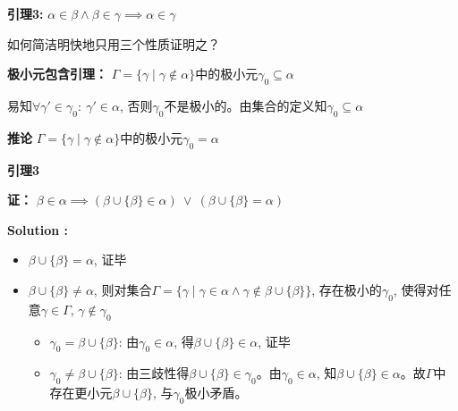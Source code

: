 \documentclass[UTF8, 9pt, a4paper]{ctexart}
\newcommand{\ksec}[2]{\noindent \textbf{\large #1} #2\par}
\newcommand{\ksolve}[1]{\noindent\textbf{\large Solution #1: }\par}
\begin{document}
	\vspace{0.5cm}
	
	\ksec{引理3: }{$ \alpha \in \beta \land \beta \in \gamma \implies \alpha \in \gamma $}
	如何简洁明快地只用三个性质证明之？
	
	\vspace{0.5cm}
	
	\ksec{极小元包含引理：}{$ \Gamma = \{ \gamma \mid \gamma \notin \alpha \} $中的极小元$ \gamma_0 \subseteq \alpha$}
	易知$ \forall \gamma' \in \gamma_0 :\ \gamma' \in \alpha$, 否则$ \gamma_0 $不是极小的。由集合的定义知$ \gamma_0 \subseteq \alpha $
	
	\ksec{推论}{ $ \Gamma = \{ \gamma \mid \gamma \notin \alpha \} $中的极小元$ \gamma_0 = \alpha$ }
	\vspace{0.5cm}
	
	\ksec{引理3}{}
	
	
	\ksec{证：}{$ \beta \in \alpha \implies (\beta \cup \{\beta\} \in \alpha)\ \lor\  (\beta\cup\{\beta\} = \alpha)$}
	\ksolve{}
	\begin{itemize}
		\item $ \beta \cup \{\beta\} = \alpha $, 证毕
		\item $ \beta \cup \{\beta\} \neq \alpha $, 则对集合$\Gamma = \{ \gamma \mid \gamma \in \alpha \land \gamma \notin \beta \cup \{\beta\} \} $, 存在极小的$ \gamma_0 $, 使得对任意$ \gamma \in \Gamma $, $ \gamma \notin \gamma_0 $
		\begin{itemize}
			\item $ \gamma_0 = \beta \cup \{\beta\} $: 由$ \gamma_0 \in \alpha $, 得$ \beta \cup \{\beta\} \in \alpha $, 证毕
			\item $ \gamma_0 \neq \beta \cup \{\beta\} $: 由三歧性得$ \beta \cup \{\beta\} \in \gamma_0 $。由$ \gamma_0 \in \alpha $, 知$ \beta \cup \{\beta\}\in \alpha $。故$ \Gamma $中存在更小元$ \beta \cup \{\beta\} $, 与$ \gamma_0 $极小矛盾。
		\end{itemize}
	\end{itemize}\par
	

	\vspace{0.5cm}
	
\end{document}
